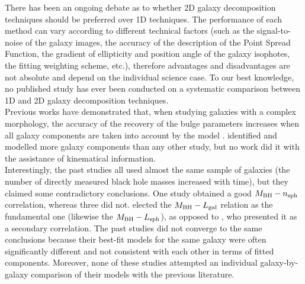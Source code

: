There has been an ongoing debate as to whether 2D galaxy decomposition techniques should be preferred over 1D techniques. 
The performance of each method can vary according to different technical factors 
(such as the signal-to-noise of the galaxy images, the accuracy of the description of the Point Spread Function, 
the gradient of ellipticity and position angle of the galaxy isophotes, 
the fitting weighting scheme, etc.), 
therefore advantages and disadvantages are not absolute and depend on the individual science case. 
To our best knowledge, 
no published study has ever been conducted on a systematic comparison between 1D and 2D galaxy decomposition techniques. \\

Previous works have demonstrated that, when studying galaxies with a complex morphology, 
the accuracy of the recovery of the bulge parameters increases 
when all galaxy components are taken into account by the model  
\citep{laurikainen2005,gadotti2008,salo2015}. 
\cite{lasker2014data} identified and modelled more galaxy components than any other study,
but no work did it with the assistance of kinematical information. \\

Interestingly, the past studies all used almost the same sample of galaxies 
(the number of directly measured black hole masses increased with time), 
but they claimed some contradictory conclusions. 
One study obtained a good $M_{\rm BH}-n_{\rm sph}$ correlation, whereas three did not.
\cite{lasker2014anal} elected the $M_{\rm BH}-L_{\rm gal}$ relation as the fundamental one
(likewise the $M_{\rm BH}-L_{\rm sph}$), 
as opposed to \cite{beifiori2012}, who presented it as a secondary correlation.
The past studies did not converge to the same conclusions 
because their best-fit models for the same galaxy were often 
significantly different and not consistent with each other in terms 
of fitted components. 
Moreover, none of these studies attempted an individual galaxy-by-galaxy 
comparison of their models with the previous literature. 

